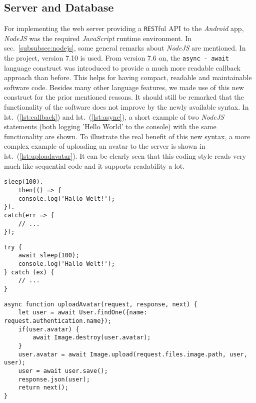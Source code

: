 \subsection{Server and Database}
\label{subsec:server}
For implementing the web server providing a \texttt{REST}ful API to the \textit{Android} app, \textit{NodeJS} was the required \textit{JavaScript} runtime environment. In sec.\ \ref{subsubsec:nodejs}, some general remarks about \textit{NodeJS} are mentioned. In the project, version 7.10 is used. From version 7.6 on, the \texttt{async - await} language construct was introduced to provide a much more readable callback approach than before. This helps for having compact, readable and maintainable software code. Besides many other language features, we made use of this new construct for the prior mentioned reasons. It should still be remarked that the functionality of the software does not improve by the newly available syntax. In lst.\ (\ref{lst:callback}) and lst.\ (\ref{lst:async}), a short example of two \textit{NodeJS} statements (both logging 'Hello World' to the console) with the same functionality are shown. To illustrate the real benefit of this new syntax, a more complex example of uploading an avatar to the server is shown in lst.\ (\ref{lst:uploadavatar}). It can be clearly seen that this coding style reads very much like sequential code and it supports readability a lot.

\begin{minipage}[b]{0.45\linewidth}
	\centering
	\label{lst:callback}
\begin{lstlisting}[caption={Old version of 'Hello World' code using callbacks.}]
sleep(100).
	then(() => {
	console.log('Hallo Welt!');
}).
catch(err => {
	// ...
});
\end{lstlisting}
\end{minipage}
\hspace{0.5cm}
\begin{minipage}[b]{0.45\linewidth}
	\centering
	\label{lst:async}
\begin{lstlisting}[caption={New version of 'Hello World' code using callbacks within an \texttt{async} function.}]
try {
	await sleep(100);
	console.log('Hallo Welt!');
} catch (ex) {
	// ...
}
\end{lstlisting}
\end{minipage}

\begin{lstlisting}[caption={Example of more complex function uploading an avatar of a user to the database.}, label=lst:uploadavatar]
async function uploadAvatar(request, response, next) {
	let user = await User.findOne({name: request.authentication.name});
	if(user.avatar) {
		await Image.destroy(user.avatar);
	}
	user.avatar = await Image.upload(request.files.image.path, user, user);
	user = await user.save();
	response.json(user);
	return next();
}
\end{lstlisting}

